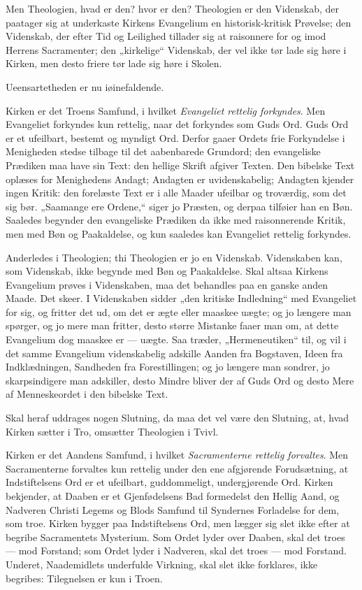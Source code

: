 \documentclass[12pt,a4paper]{book}
\newcommand{\opage}[1]{\marginnote{\footnotesize\textit{[#1]}}}
\begin{document}
Men Theologien, hvad er den? hvor er den? Theologien er den Videnskab,
der paatager sig at underkaste Kirkens Evangelium en historisk-kritisk
Prøvelse; den Videnskab, der efter Tid og Leilighed tillader sig at
raisonnere for og imod Herrens Sacramenter; den „kirkelige“ Videnskab,
der vel ikke tør lade sig høre i Kirken, men desto friere tør lade sig
høre i Skolen.

Ueensartetheden er nu iøinefaldende.

Kirken er det Troens Samfund, i hvilket \emph{Evangeliet rettelig
forkyndes}. Men Evangeliet forkyndes kun rettelig, naar det forkyndes som
Guds Ord. Guds Ord er et ufeilbart, bestemt og myndigt Ord. Derfor gaaer
Ordets frie Forkyndelse i Menigheden stedse tilbage til det aabenbarede
Grundord; den evangeliske Prædiken maa have sin Text: den hellige Skrift
afgiver Texten. Den bibelske Text oplæses for Menighedens Andagt;
Andagten er uvidenskabelig; Andagten kjender ingen Kritik: den forelæste
Text er i alle Maader ufeilbar og troværdig, som det sig bør. „Saamange
ere Ordene,“ siger jo Præsten, og derpaa tilføier han en Bøn. Saaledes
begynder den evangeliske
\opage{12} Prædiken da ikke med raisonnerende Kritik, men med Bøn og Paakaldelse, og
kun saaledes kan Evangeliet rettelig forkyndes.

Anderledes i Theologien; thi Theologien er jo en Videnskab. Videnskaben
kan, som Videnskab, ikke begynde med Bøn og Paakaldelse. Skal altsaa
Kirkens Evangelium prøves i Videnskaben, maa det behandles paa en ganske
anden Maade. Det skeer. I Videnskaben sidder „den kritiske Indledning“
med Evangeliet for sig, og fritter det ud, om det er ægte eller maaskee
uægte; og jo længere man spørger, og jo mere man fritter, desto større
Mistanke faaer man om, at dette Evangelium dog maaskee er --- uægte. Saa
træder, „Hermeneutiken“ til, og vil i det samme Evangelium videnskabelig
adskille Aanden fra Bogstaven, Ideen fra Indklædningen, Sandheden fra
Forestillingen; og jo længere man sondrer, jo skarpsindigere man
adskiller, desto Mindre bliver der af Guds Ord og desto Mere af
Menneskeordet i den bibelske Text.

Skal heraf uddrages nogen Slutning, da maa det vel være den Slutning, at,
hvad Kirken sætter i Tro, omsætter Theologien i Tvivl.

Kirken er det Aandens Samfund, i hvilket \emph{Sacramenterne rettelig
forvaltes}. Men Sacramenterne forvaltes kun rettelig under den ene
afgjørende Forudsætning, at Indstiftelsens Ord er et ufeilbart,
guddommeligt, undergjørende Ord. Kirken bekjender, at Daaben er et
Gjenfødelsens Bad formedelst den Hellig Aand, og Nadveren Christi Legems
og Blods Samfund til Syndernes Forladelse for dem, som troe. Kirken
bygger paa Indstiftelsens Ord, men lægger sig slet ikke efter at begribe
Sacramentets Mysterium. Som Ordet lyder over Daaben, skal det troes ---
mod Forstand; som Ordet lyder i Nadveren, skal det troes --- mod
Forstand. Underet, Naademidlets underfulde Virkning, skal slet ikke
forklares, ikke begribes: Tilegnelsen er kun i Troen.
\end{document}
